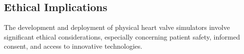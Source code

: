 

\subsection{Ethical Implications}
The development and deployment of physical heart valve simulators involve significant ethical considerations, especially concerning patient safety, informed consent, and access to innovative technologies.

